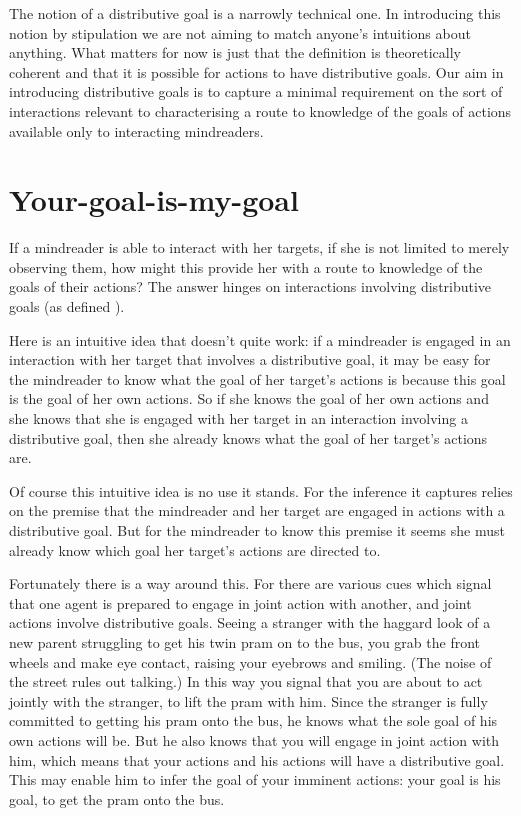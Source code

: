 \documentclass[12pt,a4paper]{extarticle}
\begin{document}
The notion of a distributive goal is a 
narrowly technical one.
In introducing this notion by stipulation we are not aiming to match anyone's intuitions about anything.
What matters for now is just that the definition is theoretically coherent and that it is possible for actions to have distributive goals.
Our aim in introducing distributive goals 
 is to capture a minimal requirement on the sort of interactions 
relevant to characterising a route to knowledge of the goals of actions
available only to interacting mindreaders.
% 


\section{Your-goal-is-my-goal}
\label{sec:your_goal_is_my_goal}
If a mindreader is able to interact with her targets,
if she is not limited to merely observing them,
how might this provide her with a route to knowledge of the goals of their actions?
The answer hinges on interactions involving distributive goals
(as defined ).

Here is an intuitive idea that doesn't quite work:
if a mindreader is engaged in an interaction with her target that involves a distributive goal, 
it may be easy for the mindreader to know what the goal of her target's actions is because this goal is the goal of her own actions.
So if she knows the goal of her own actions and she knows that she is engaged with her target in an interaction involving a distributive goal,
then she already knows what the goal of her target's actions are.

Of course this intuitive idea is no use it stands.  
For the inference it captures relies on the premise that the mindreader and her target are engaged in actions with a distributive goal.
But for the mindreader to know this premise it seems she must   already know which goal her target's actions are directed to.

Fortunately there is a way around this.  
For there are various cues which signal that one agent is prepared to engage in joint action with another,
and joint actions involve distributive goals.  
\label{twin_pram}
Seeing a stranger with the haggard look of a new parent struggling to get his twin pram on to the bus, you grab the front wheels and make eye contact, raising your eyebrows and smiling.
(The noise of the street rules out talking.)   
In this way you signal that you are about to act jointly with the stranger, to lift the pram with him.   
Since the stranger is fully committed to getting his pram onto the bus,
he knows what the sole goal of his own actions will be.
But he also knows that you will engage in joint action with him,
which means that your actions and his actions will have a distributive goal.
This may enable him to infer the goal of your imminent actions: 
your goal is his goal, to get the pram onto the bus.
\end{document}
